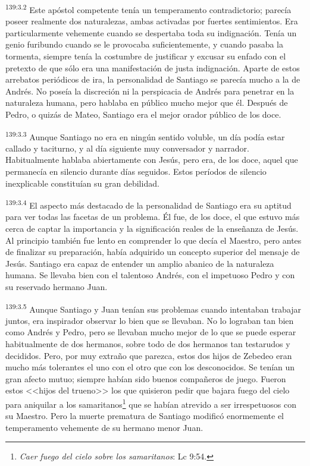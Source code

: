 \par 
\textsuperscript{139:3.2} Este apóstol competente tenía un temperamento contradictorio; parecía poseer realmente dos naturalezas, ambas activadas por fuertes sentimientos. Era particularmente vehemente cuando se despertaba toda su indignación. Tenía un genio furibundo cuando se le provocaba suficientemente, y cuando pasaba la tormenta, siempre tenía la costumbre de justificar y excusar su enfado con el pretexto de que sólo era una manifestación de justa indignación. Aparte de estos arrebatos periódicos de ira, la personalidad de Santiago se parecía mucho a la de Andrés. No poseía la discreción ni la perspicacia de Andrés para penetrar en la naturaleza humana, pero hablaba en público mucho mejor que él. Después de Pedro, o quizás de Mateo, Santiago era el mejor orador público de los doce.

\par 
\textsuperscript{139:3.3} Aunque Santiago no era en ningún sentido voluble, un día podía estar callado y taciturno, y al día siguiente muy conversador y narrador. Habitualmente hablaba abiertamente con Jesús, pero era, de los doce, aquel que permanecía en silencio durante días seguidos. Estos períodos de silencio inexplicable constituían su gran debilidad.

\par 
\textsuperscript{139:3.4} El aspecto más destacado de la personalidad de Santiago era su aptitud para ver todas las facetas de un problema. Él fue, de los doce, el que estuvo más cerca de captar la importancia y la significación reales de la enseñanza de Jesús. Al principio también fue lento en comprender lo que decía el Maestro, pero antes de finalizar su preparación, había adquirido un concepto superior del mensaje de Jesús. Santiago era capaz de entender un amplio abanico de la naturaleza humana. Se llevaba bien con el talentoso Andrés, con el impetuoso Pedro y con su reservado hermano Juan.

\par 
\textsuperscript{139:3.5} Aunque Santiago y Juan tenían sus problemas cuando intentaban trabajar juntos, era inspirador observar lo bien que se llevaban. No lo lograban tan bien como Andrés y Pedro, pero se llevaban mucho mejor de lo que se puede esperar habitualmente de dos hermanos, sobre todo de dos hermanos tan testarudos y decididos. Pero, por muy extraño que parezca, estos dos hijos de Zebedeo eran mucho más tolerantes el uno con el otro que con los desconocidos. Se tenían un gran afecto mutuo; siempre habían sido buenos compañeros de juego. Fueron estos <<hijos del trueno>> los que quisieron pedir que bajara fuego del cielo para aniquilar a los samaritanos\footnote{\textit{Caer fuego del cielo sobre los samaritanos}: Lc 9:54.} que se habían atrevido a ser irrespetuosos con su Maestro. Pero la muerte prematura de Santiago modificó enormemente el temperamento vehemente de su hermano menor Juan.

